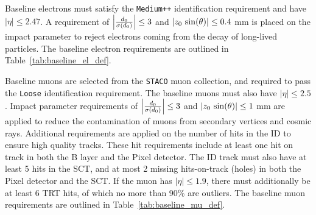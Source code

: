 Baseline electrons must satisfy the \texttt{Medium++} identification
requirement and have $|\eta| \leq 2.47$.
A requirement of $ \left| \frac{d_0}{\sigma(d_0)} \right|  \leq 3$ and
$ \left| z_0\,\sin(\theta) \right|  \leq 0.4$ mm is placed on the impact parameter
to reject electrons coming from the decay of long-lived particles.
The baseline electron requirements are outlined in
Table~\ref{tab:baseline_el_def}.

\begin{table}[ht]
  \caption{
    Baseline electron requirements.
  }
  \label{tab:baseline_el_def}
\end{table}

Baseline muons are selected from the \texttt{STACO} muon collection, and
required to pass the \texttt{Loose} identification requirement. The baseline
muons must also have $|\eta| \leq 2.5$.
Impact parameter requirements of $ \left| \frac{d_0}{\sigma(d_0)} \right|  \leq 3$ and
$ \left| z_0\,\sin(\theta) \right|  \leq 1$ mm are applied to reduce the contamination of muons
from secondary vertices and cosmic rays.
Additional requirements are applied on the number of hits in the ID to ensure
high quality tracks.
These  hit requirements include at least one hit on track in both the B layer
and the Pixel detector.
The ID track must also have at least 5 hits in the SCT, and at most 2 missing 
hits-on-track (holes) in both the Pixel detector and the SCT. 
If the muon has $|\eta| \leq 1.9$, there must additionally be at least 6 TRT
hits, of which no more than 90\% are outliers.
The baseline muon requirements are outlined in Table~\ref{tab:baseline_mu_def}.

